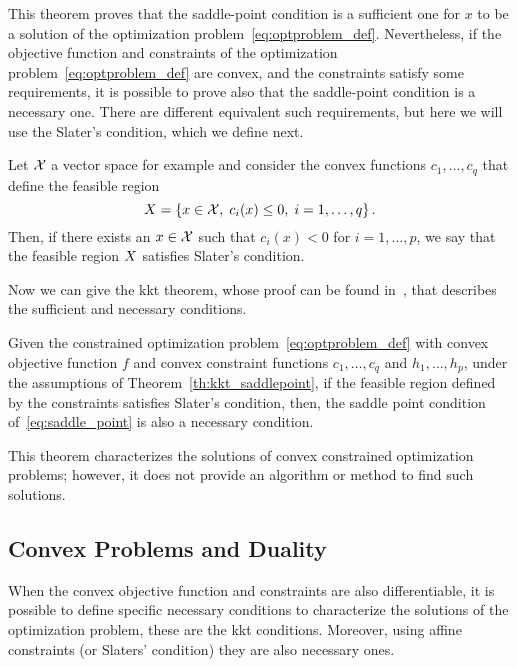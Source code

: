 This theorem proves that the saddle-point condition is a sufficient one for $x$ to be a solution of the optimization problem~\eqref{eq:optproblem_def}.
Nevertheless, if the objective function and constraints of the optimization problem~\eqref{eq:optproblem_def} are convex, and the constraints satisfy some requirements, it is possible to prove also that the saddle-point condition is a necessary one.
There are different equivalent such requirements, but here we will use the Slater's condition, which we define next.
\begin{definition}
    Let $\mathcal{X}$ a vector space for example and consider the convex functions $c_1, \ldots, c_q$ that define the feasible region
    \begin{equation}
        X = \left\{x \in \mathcal{X}, \; c_i(x) \leq 0, \; i=1, \ldots, q\right\} .
    \end{equation}  
    Then, if there exists an $x \in \mathcal{X}$ such that $c_i(x) < 0$ for $i=1, \ldots, p$, we say that the feasible region $X$ satisfies Slater's condition.       
\end{definition}
Now we can give the \acrshort{kkt} theorem, whose proof can be found in~\citet{ScholkopfS02}, that describes the sufficient and necessary conditions.
\begin{theorem}
    Given the constrained optimization problem~\eqref{eq:optproblem_def} with convex objective function $f$ and convex constraint functions $c_1, \ldots, c_q$ and $h_1, \ldots, h_p$, 
    under the assumptions of Theorem~\ref{th:kkt_saddlepoint}, if the feasible region defined by the constraints satisfies Slater's condition, then, the saddle point condition of~\eqref{eq:saddle_point} is also a necessary condition.
\end{theorem}
This theorem characterizes the solutions of convex constrained optimization problems; however, it does not provide an algorithm or method to find such solutions.

\subsection{Convex Problems and Duality}
When the convex objective function and constraints are also differentiable, it is possible to define specific necessary conditions to characterize the solutions of the optimization problem, these are the \acrshort{kkt} conditions. Moreover, using affine constraints (or Slaters' condition) they are also necessary ones.

